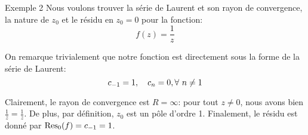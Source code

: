 \documentclass[a4paper]{article}
\begin{document}
\begin{parag}{Exemple 2}
    Nous voulons trouver la série de Laurent et son rayon de convergence, la nature de $z_0$ et le résidu en $z_0 = 0$ pour la fonction: 
    \[f\left(z\right) = \frac{1}{z}\]
    
    On remarque trivialement que notre fonction est directement sous la forme de la série de Laurent: 
    \[c_{-1} = 1, \quad c_n = 0, \forall\ n \neq 1\]
    
    Clairement, le rayon de convergence est $R = \infty$: pour tout $z \neq 0$, nous avons bien $\frac{1}{z} = \frac{1}{z}$. De plus, par définition, $z_0$ est un pôle d'ordre 1. Finalement, le résidu est donné par $\Res_0\left(f\right) = c_{-1} = 1$.
\end{parag}
\end{document}
